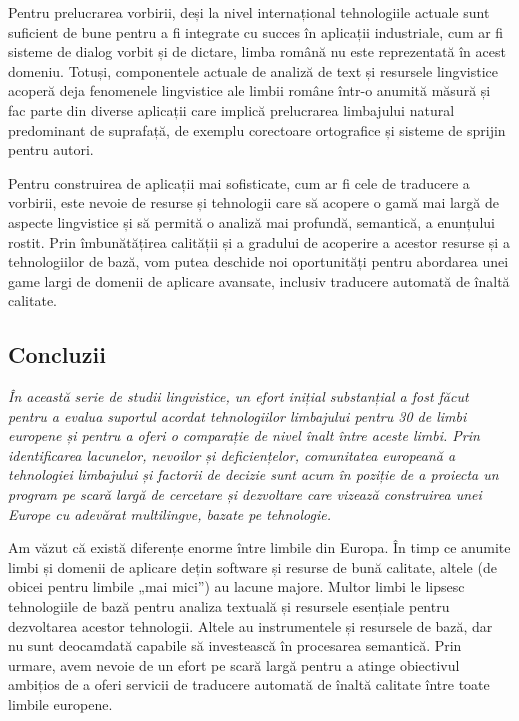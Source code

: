 \begin{multicols}{2}
Pentru prelucrarea vorbirii, deși la nivel internațional tehnologiile actuale sunt suficient de bune pentru a fi integrate cu succes în aplicații industriale, cum ar fi sisteme de dialog vorbit și de dictare, limba română nu este reprezentată în acest domeniu. Totuși, componentele actuale de analiză de text și resursele lingvistice acoperă deja fenomenele lingvistice ale limbii române într-o anumită măsură și fac parte din diverse aplicații care implică prelucrarea limbajului natural predominant de suprafață, de exemplu corectoare ortografice și sisteme de sprijin pentru autori.

Pentru construirea de aplicații mai sofisticate, cum ar fi cele de traducere a vorbirii, este nevoie de resurse și tehnologii care să acopere o gamă mai largă de aspecte lingvistice și să permită o analiză mai profundă, semantică, a enunțului rostit. Prin îmbunătățirea calității și a gradului de acoperire a acestor resurse și a tehnologiilor de bază, vom putea deschide noi oportunități pentru abordarea unei game largi de domenii de aplicare avansate, inclusiv traducere automată de înaltă calitate.

\subsection{Concluzii}

\emph{În această serie de studii lingvistice, un efort inițial substanțial a fost făcut pentru a evalua suportul acordat tehnologiilor limbajului pentru 30 de limbi europene și pentru a oferi o comparație de nivel înalt între aceste limbi. Prin identificarea lacunelor, nevoilor și deficiențelor, comunitatea europeană a tehnologiei limbajului și factorii de decizie sunt acum în poziție de a proiecta un program pe scară largă de cercetare și dezvoltare care vizează construirea unei Europe cu adevărat multilingve, bazate pe tehnologie.}

Am văzut că există diferențe enorme între limbile din Europa. În timp ce anumite limbi și domenii de aplicare dețin software și resurse de bună calitate, altele (de obicei pentru limbile „mai mici”) au lacune majore. Multor limbi le lipsesc tehnologiile de bază pentru analiza textuală și resursele esențiale pentru dezvoltarea acestor tehnologii. Altele au instrumentele și resursele de bază, dar nu sunt deocamdată capabile să investească în procesarea semantică. Prin urmare, avem nevoie de un efort pe scară largă pentru a atinge obiectivul ambițios de a oferi servicii de traducere automată de înaltă calitate între toate limbile europene.


\end{multicols}
